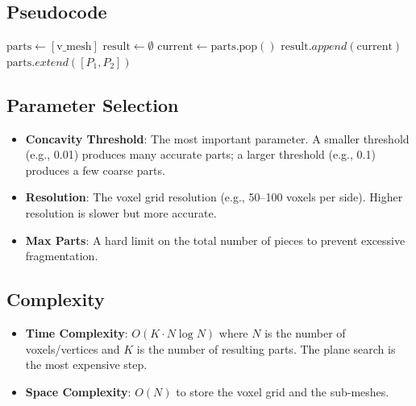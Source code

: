 \subsection{Pseudocode}
\begin{algorithm}
\caption{CoACD}
\label{alg:coacd}
\begin{algorithmic}[1]
    \State {}
    \State $\text{parts} \gets [\text{v\_mesh}]$
    \State $\text{result} \gets \emptyset$
        \State $\text{current} \gets \text{parts}.\text{pop}()$
        \State {}
            \State $\text{result}.append(\text{current})$
        \Else
            \State {}
            \State {}
            \State $\text{parts}.extend([P_1, P_2])$
        \EndIf
    \EndWhile
    \State {}
    \State \Return {}
\EndFunction
\end{algorithmic}
\end{algorithm}

\subsection{Parameter Selection}
\begin{itemize}
\item \textbf{Concavity Threshold}: The most important parameter. A smaller threshold (e.g., 0.01) produces many accurate parts; a larger threshold (e.g., 0.1) produces a few coarse parts.
\item \textbf{Resolution}: The voxel grid resolution (e.g., 50--100 voxels per side). Higher resolution is slower but more accurate.
\item \textbf{Max Parts}: A hard limit on the total number of pieces to prevent excessive fragmentation.
\end{itemize}

\subsection{Complexity}
\begin{itemize}
\item \textbf{Time Complexity}: $O(K \cdot N \log N)$ where $N$ is the number of voxels/vertices and $K$ is the number of resulting parts. The plane search is the most expensive step.
\item \textbf{Space Complexity}: $O(N)$ to store the voxel grid and the sub-meshes.
\end{itemize}

